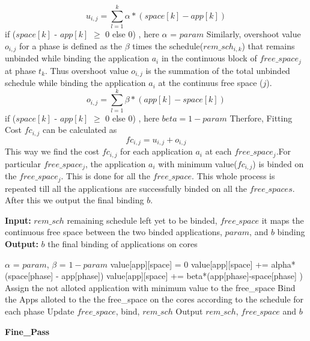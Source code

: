 \documentclass[10pt, conference]{IEEEtran}
\begin{document}
\begin{equation} 
u_{i,j} = \sum\limits_{l=1}^k \alpha*(space[k]-app[k])
\label{undershoot}
\end{equation}
if ($space[k]$ - $app[k]$ $\geq$ 0 else 0) , here $\alpha$ = $param$ 
Similarly, overshoot value $o_{i,j}$ for a phase is defined as the $\beta$ times the schedule($rem\_sch_{i,k}$) that remains unbinded while binding the application $a_i$ in the continuous block of $free\_space_j$ at phase $t_k$. Thus overshoot value $o_{i,j}$ is the summation of the total unbinded schedule while binding the application $a_i$ at the continuus free space ($j$).\ \\
\begin{equation} 
o_{i,j} = \sum\limits_{l=1}^k \beta*(app[k]-space[k])
\label{overhoot}
\end{equation}
if ($space[k]$ - $app[k]$ $\geq$ 0 else 0) , here $beta = 1- param$
Therfore, Fitting Cost $fc_{i,j}$ can be calculated as \ \\
\begin{equation} 
fc_{i,j} = u_{i,j} + o_{i,j}
\label{fittingcost}
\end{equation}
This way we find the cost $fc_{i,j}$ for each application $a_i$ at each $free\_space_j$.For particular $free\_space_j$, the application $a_i$ with minimum value($fc_{i,j}$) is binded on the $free\_space_j$. This is done for all the $free\_space$. This whole process is repeated till all the applications are successfully binded on all the $free\_spaces$. After this we output the final binding $b$.

\begin{algorithm}[tb]
\footnotesize
\textbf{Input:} $rem\_sch$ remaining schedule left yet to be binded, $free\_space$ it maps the continuous free space between the two binded applications, $param$, and  $b$ binding
\textbf{Output:} $b$ the final binding of applications on cores
\begin{algorithmic}[1]
\STATE $\alpha$ = $param$, $\beta$ = $1-param$
\STATE value[app][space] = 0
\STATE value[app][space] += alpha*(space[phase] - app[phase])
\ELSE   
\STATE value[app][space] += beta*(app[phase]-space[phase] )
\ENDIF
\STATE Assign the not alloted application with minimum value to the free\_space
\STATE Bind the Apps alloted to the the free\_space on the cores according to the schedule for each phase
\STATE Update $free\_space$, bind, $rem\_sch$ 
\ENDFOR
\ENDFOR
\ENDFOR
\STATE Output $rem\_sch$, $free\_space$ and $b$
\end{algorithmic}
\caption{\textbf{Fine\_Pass}}
\vspace{-0.1cm}
\label{algLRP2}
\end{algorithm}
\end{document}
